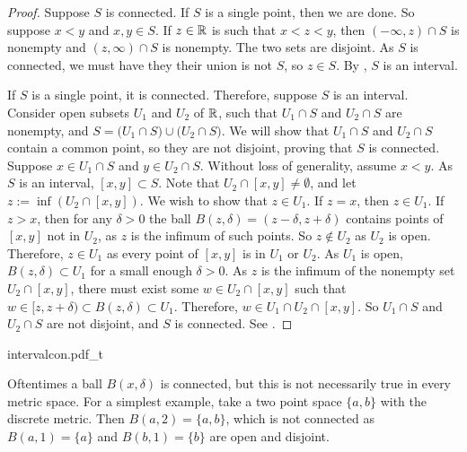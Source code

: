 \begin{proof}
Suppose $S$ is connected.  If $S$ is a single point,
then we are done.  So suppose $x < y$ and $x,y \in S$.  If $z \in {\mathbb{R}}$ is such
that $x < z < y$, then $(-\infty,z) \cap S$ is nonempty and $(z,\infty) \cap
S$ is nonempty.  The two sets are disjoint.  As
$S$ is connected, we must have they their union is not $S$, so $z \in S$.
By , $S$ is an interval.

If $S$ is a single point, it is connected.
Therefore, suppose $S$ is an interval.
Consider open subsets $U_1$ and $U_2$ of ${\mathbb{R}}$, such that
$U_1 \cap S$ and $U_2 \cap S$ are nonempty, and
$S = 
\bigl( U_1 \cap S \bigr)
\cup
\bigl( U_2 \cap S \bigr)$.  We will show that $U_1 \cap S$
and $U_2 \cap S$ contain a common point, so they are not disjoint,
proving that $S$ is connected.
Suppose $x \in U_1 \cap S$
and $y \in U_2 \cap S$.  Without loss of generality, assume $x < y$.
As $S$ is an interval, $[x,y] \subset S$.
Note that $U_2 \cap [x,y] \not= \emptyset$, and
let $z := \inf (U_2 \cap [x,y])$.
We wish to show that $z \in U_1$.
If $z = x$, then $z \in U_1$.
If $z > x$,
then for any $\delta > 0$ the ball $B(z,\delta) =
(z-\delta,z+\delta)$ contains points of $[x,y]$ not in $U_2$,
as $z$ is the infimum of such points.
So $z \notin U_2$ as $U_2$ is open.
Therefore, $z \in U_1$ as every point of $[x,y]$ is in
$U_1$ or $U_2$.
As $U_1$ is open,
$B(z,\delta) \subset U_1$ for a small enough $\delta > 0$.
As $z$ is the infimum of the nonempty set $U_2 \cap [x,y]$, 
there must exist some $w \in U_2 \cap [x,y]$
such that $w \in [z,z+\delta) \subset B(z,\delta) \subset U_1$.
Therefore, $w \in U_1 \cap U_2 \cap [x,y]$.
So $U_1 \cap S$ and $U_2 \cap S$ are not disjoint, and
$S$ is connected.
See .
\end{proof}

\begin{myfigureht}
{intervalcon.pdf_t}
\caption{Proof that an interval is connected.\label{fig:intervalcon}}
\end{myfigureht}

\begin{example}
Oftentimes a ball $B(x,\delta)$ is connected, but this is not
necessarily true in every metric space.
For a simplest example, take a two point space $\{ a,
b\}$ with the discrete metric.  Then $B(a,2) = \{ a , b \}$, which is not
connected as $B(a,1) = \{ a \}$ and 
$B(b,1) = \{ b \}$ are open and disjoint.
\end{example}

